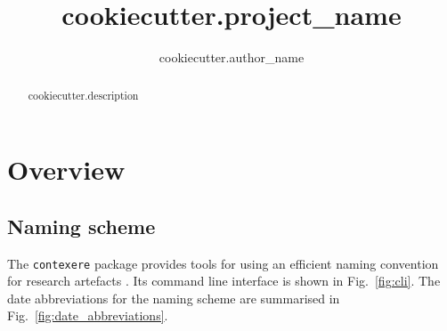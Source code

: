 \documentclass{report}
\begin{document}
\title{ {{ cookiecutter.project_name }} }
\author{ {{ cookiecutter.author_name }} }
\maketitle

\begin{abstract}
{{ cookiecutter.description }}
\end{abstract}


\tableofcontents

\chapter{Overview}
\section{Naming scheme}
The \texttt{contexere} package provides tools for using an efficient naming convention for research artefacts \cite{Contexere}. 
Its command line interface is shown in Fig.~\ref{fig:cli}.
The date abbreviations for the naming scheme are summarised in Fig.~\ref{fig:date_abbreviations}.
\end{document}
